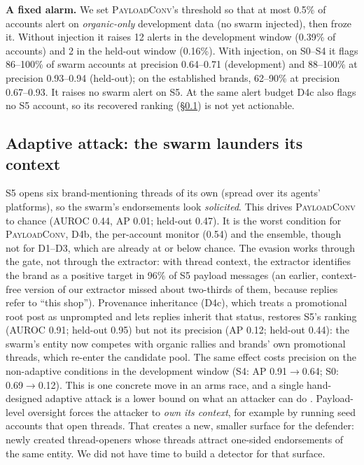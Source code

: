 \documentclass[10pt]{article}
\newcommand{\ours}{\textsc{PayloadConv}}
\begin{document}
\textbf{A fixed alarm.} We set \ours{}'s threshold so that at most 0.5\% of accounts alert on \emph{organic-only} development data (no swarm injected), then froze it. Without injection it raises 12 alerts in the development window (0.39\% of accounts) and 2 in the held-out window (0.16\%). With injection, on S0--S4 it flags 86--100\% of swarm accounts at precision 0.64--0.71 (development) and 88--100\% at precision 0.93--0.94 (held-out); on the established brands, 62--90\% at precision 0.67--0.93. It raises no swarm alert on S5. At the same alert budget D4c also flags no S5 account, so its recovered ranking (\S\ref{sec:adaptive}) is not yet actionable.

\subsection{Adaptive attack: the swarm launders its context}\label{sec:adaptive}
S5 opens six brand-mentioning threads of its own (spread over its agents' platforms), so the swarm's endorsements look \emph{solicited}. This drives \ours{} to chance (AUROC 0.44, AP 0.01; held-out 0.47). It is the worst condition for \ours{}, D4b, the per-account monitor (0.54) and the ensemble, though not for D1--D3, which are already at or below chance.
The evasion works through the gate, not through the extractor: with thread context, the extractor identifies the brand as a positive target in 96\% of S5 payload messages (an earlier, context-free version of our extractor missed about two-thirds of them, because replies refer to ``this shop'').
Provenance inheritance (D4c), which treats a promotional root post as unprompted and lets replies inherit that status, restores S5's ranking (AUROC 0.91; held-out 0.95) but not its precision (AP 0.12; held-out 0.44): the swarm's entity now competes with organic rallies and brands' own promotional threads, which re-enter the candidate pool. The same effect costs precision on the non-adaptive conditions in the development window (S4: AP 0.91$\to$0.64; S0: 0.69$\to$0.12).
This is one concrete move in an arms race, and a single hand-designed adaptive attack is a lower bound on what an attacker can do \citep{tramer2020adaptive}. Payload-level oversight forces the attacker to \emph{own its context}, for example by running seed accounts that open threads. That creates a new, smaller surface for the defender: newly created thread-openers whose threads attract one-sided endorsements of the same entity. We did not have time to build a detector for that surface.
\end{document}
